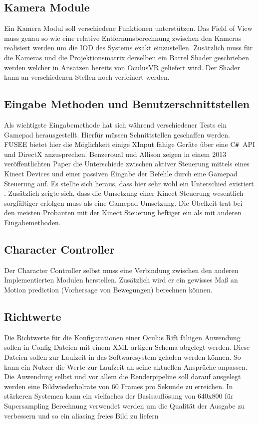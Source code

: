 \documentclass[pagesize, paper=a4, fontsize=12pt,titlepage=true, headings=small, headnosepline, abstractoff, liststotoc, nochapterprefix, plainheadsepline, twoside]{scrreprt}
\newcommand{\CSS}{C\texttt{\# }}
\begin{document}
\subsection{Kamera Module}
Ein Kamera Modul soll verschiedene Funktionen unterstützen. Das Field of View muss genau  so wie eine relative Entfernunsberechnung zwischen den Kameras realisiert werden um die IOD des Systems exakt einzustellen. Zusätzlich muss für die Kameras und die Projektionsmatrix derselben ein Barrel Shader geschrieben werden welcher in Ansätzen bereits von OculusVR geliefert wird. Der Shader kann an verschiedenen Stellen noch verfeinert werden.

\subsection{Eingabe Methoden und Benutzerschnittstellen}
Als wichtigste Eingabemethode hat sich während verschiedener Tests ein Gamepad herausgestellt. Hierfür müssen Schnittstellen geschaffen werden. FUSEE bietet hier die Möglichkeit einige XInput fähige Geräte über eine \CSS API und DirectX anzusprechen. Benzeroual und Allison zeigen in einem 2013 veröffentlichten Paper die Unterschiede zwischen aktiver Steuerung mittels eines Kinect Devices und einer passiven Eingabe der Befehle durch eine Gamepad Steuerung auf. Es stellte sich heraus, dass  hier sehr wohl ein Unterschied existiert \cite{BenzAllison2013}. Zusätzlich zeigte sich, dass die Umsetzung einer Kinect Steuerung wesentlich sorgfältiger erfolgen muss als eine Gamepad Umsetzung. Die Übelkeit trat bei den meisten Probanten mit der Kinect Steuerung heftiger ein als mit anderen Eingabemethoden.

\subsection{Character Controller}
Der Character Controller selbst muss eine Verbindung zwischen den anderen Implementierten Modulen herstellen. Zusätzlich wird er ein gewisses Maß an Motion prediction (Vorhersage von Bewegungen) berechnen können.

\subsection{Richtwerte}
Die Richtwerte für die Konfigurationen einer Oculus Rift fähigen Anwendung sollen in Config Dateien mit einem XML artigen Schema abgelegt werden. Diese Dateien sollen zur Laufzeit in das Softwaresystem geladen werden können. So kann ein Nutzer die Werte zur Laufzeit an seine aktuellen Ansprüche anpassen. Die Anwendung selbst und vor allem die Renderpipeline soll darauf ausgelegt werden eine Bildwiederholrate von 60 Frames pro Sekunde zu erreichen. In stärkeren Systemen kann ein vielfaches der Basisauflösung von 640x800 für Supersampling Berechnung verwendet werden um die Qualität der Ausgabe zu verbessern und so ein aliasing freies Bild zu liefern
\end{document}
